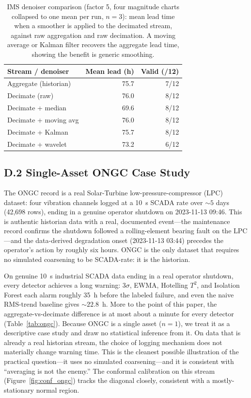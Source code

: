 \documentclass[IJPHM, 2026, 0]{PHMSociety}
\begin{document}
\begin{table}[t] \small
	\begin{center}
	\caption{IMS denoiser comparison (factor 5, four magnitude charts collapsed to one mean per run, $n=3$): mean lead time when a smoother is applied to the decimated stream, against raw aggregation and raw decimation. A moving average or Kalman filter recovers the aggregate lead time, showing the benefit is generic smoothing.}
	\label{tab:denoise}
	\begin{tabular}{l r r}
		\hline \hline
		\textbf{Stream / denoiser} & \textbf{Mean lead (h)} & \textbf{Valid (/12)} \\
		\hline
		Aggregate (historian) & 75.7 & 7/12 \\
		Decimate (raw) & 76.0 & 8/12 \\
		Decimate + median & 69.6 & 8/12 \\
		Decimate + moving avg & 76.0 & 8/12 \\
		Decimate + Kalman & 75.7 & 8/12 \\
		Decimate + wavelet & 73.2 & 6/12 \\
		\hline \hline
	\end{tabular}
	\end{center}
\end{table}

\subsection*{D.2 Single-Asset ONGC Case Study}
The ONGC record is a real Solar-Turbine low-pressure-compressor (LPC) dataset: four vibration channels logged at a 10~s SCADA rate over ${\sim}5$ days (42,698 rows), ending in a genuine operator shutdown on 2023-11-13 09:46. This is authentic historian data with a real, documented event---the maintenance record confirms the shutdown followed a rolling-element bearing fault on the LPC---and the data-derived degradation onset (2023-11-13 03:44) precedes the operator's action by roughly six hours. ONGC is the only dataset that requires no simulated coarsening to be SCADA-rate: it is the historian.

On genuine 10~s industrial SCADA data ending in a real operator shutdown, every detector achieves a long warning: $3\sigma$, EWMA, Hotelling $T^2$, and Isolation Forest each alarm roughly 35~h before the labeled failure, and even the naive RMS-trend baseline gives ${\sim}22.8$~h. More to the point of this paper, the aggregate-vs-decimate difference is at most about a minute for every detector (Table~\ref{tab:ongc}). Because ONGC is a single asset ($n=1$), we treat it as a descriptive case study and draw no statistical inference from it. On data that is already a real historian stream, the choice of logging mechanism does not materially change warning time. This is the cleanest possible illustration of the practical question---it uses no simulated coarsening---and it is consistent with ``averaging is not the enemy.'' The conformal calibration on this stream (Figure~\ref{fig:conf_ongc}) tracks the diagonal closely, consistent with a mostly-stationary normal region.
\end{document}
